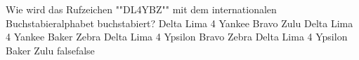     {Wie wird das Rufzeichen ""DL4YBZ"" mit dem internationalen Buchstabieralphabet  buchstabiert?}
    {Delta Lima 4 Yankee Bravo Zulu}
    {Delta Lima 4 Yankee Baker Zebra}
    {Delta Lima 4 Ypsilon Bravo Zebra}
    {Delta Lima 4 Ypsilon Baker Zulu}
    {false}{false}